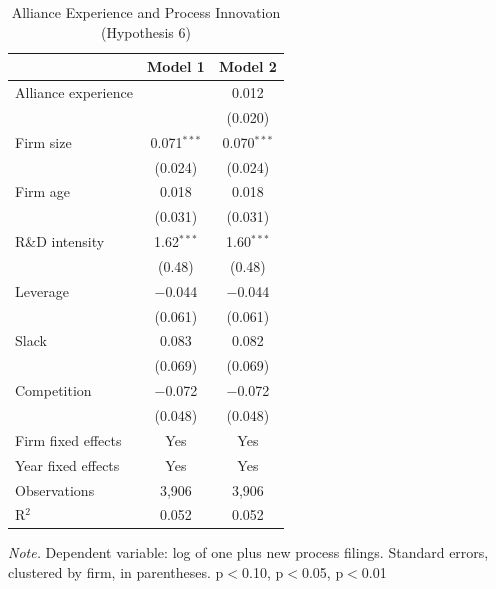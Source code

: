 \documentclass[12pt]{article}
\begin{document}
\begin{table}[p]
\centering\small
\caption{Alliance Experience and Process Innovation (Hypothesis 6)}
\begin{tabular}{lcc}
\toprule
 & Model 1 & Model 2 \\
\midrule
Alliance experience &  & 0.012 \\
 &  & (0.020) \\[2pt]
Firm size & 0.071$^{***}$ & 0.070$^{***}$ \\
 & (0.024) & (0.024) \\[2pt]
Firm age & 0.018 & 0.018 \\
 & (0.031) & (0.031) \\[2pt]
R\&D intensity & 1.62$^{***}$ & 1.60$^{***}$ \\
 & (0.48) & (0.48) \\[2pt]
Leverage & $-$0.044 & $-$0.044 \\
 & (0.061) & (0.061) \\[2pt]
Slack & 0.083 & 0.082 \\
 & (0.069) & (0.069) \\[2pt]
Competition & $-$0.072 & $-$0.072 \\
 & (0.048) & (0.048) \\[2pt]
\midrule
Firm fixed effects & Yes & Yes \\
Year fixed effects & Yes & Yes \\
Observations & 3,906 & 3,906 \\
R$^2$ & 0.052 & 0.052 \\
\bottomrule
\end{tabular}
\begin{minipage}{0.92\textwidth}\footnotesize\smallskip
\textit{Note.} Dependent variable: log of one plus new process filings. Standard errors, clustered by firm, in parentheses. \textasteriskcentered{} p$<$0.10, \textasteriskcentered{}\textasteriskcentered{} p$<$0.05, \textasteriskcentered{}\textasteriskcentered{}\textasteriskcentered{} p$<$0.01
\end{minipage}
\end{table}
\clearpage
\end{document}
